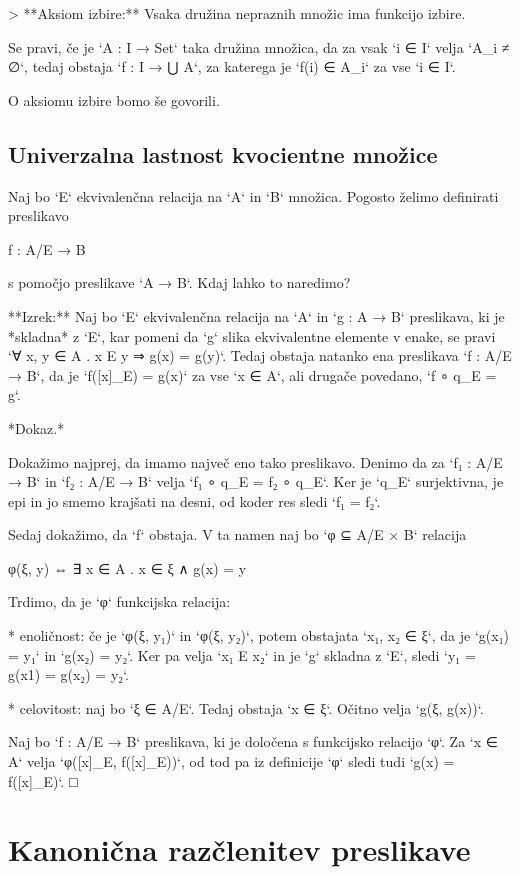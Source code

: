 > **Aksiom izbire:** Vsaka družina nepraznih množic ima funkcijo izbire.

Se pravi, če je `A : I → Set` taka družina množica, da za vsak `i ∈ I` velja `A_i ≠ ∅`,
tedaj obstaja `f : I → ⋃ A`, za katerega je `f(i) ∈ A_i` za vse `i ∈ I`.

O aksiomu izbire bomo še govorili.

\subsection{Univerzalna lastnost kvocientne množice}

Naj bo `E` ekvivalenčna relacija na `A` in `B` množica. Pogosto želimo definirati
preslikavo

    f : A/E → B

s pomočjo preslikave `A → B`. Kdaj lahko to naredimo?

**Izrek:** Naj bo `E` ekvivalenčna relacija na `A` in `g : A → B` preslikava, ki je
*skladna* z `E`, kar pomeni da `g` slika ekvivalentne elemente v enake, se pravi `∀ x, y ∈
A . x E y ⇒ g(x) = g(y)`. Tedaj obstaja natanko ena preslikava `f : A/E → B`, da je
`f([x]_E) = g(x)` za vse `x ∈ A`, ali drugače povedano, `f ∘ q_E = g`.

*Dokaz.*

Dokažimo najprej, da imamo največ eno tako preslikavo. Denimo da za `f₁ : A/E → B` in
`f₂ : A/E → B` velja `f₁ ∘ q_E = f₂ ∘ q_E`. Ker je `q_E` surjektivna, je epi in jo smemo
krajšati na desni, od koder res sledi `f₁ = f₂`.

Sedaj dokažimo, da `f` obstaja. V ta namen naj bo `φ ⊆ A/E × B` relacija

    φ(ξ, y) ⇔ ∃ x ∈ A . x ∈ ξ ∧ g(x) = y

Trdimo, da je `φ` funkcijska relacija:

* enoličnost: če je `φ(ξ, y₁)` in `φ(ξ, y₂)`, potem obstajata `x₁, x₂ ∈ ξ`, da je `g(x₁) =
  y₁` in `g(x₂) = y₂`. Ker pa velja `x₁ E x₂` in je `g` skladna z `E`, sledi `y₁ = g(x1) =
  g(x₂) = y₂`.

* celovitost: naj bo `ξ ∈ A/E`. Tedaj obstaja `x ∈ ξ`. Očitno velja `g(ξ, g(x))`.

Naj bo `f : A/E → B` preslikava, ki je določena s funkcijsko relacijo `φ`. Za `x ∈ A`
velja `φ([x]_E, f([x]_E))`, od tod pa iz definicije `φ` sledi tudi `g(x) = f([x]_E)`. □


\section{Kanonična razčlenitev preslikave}

